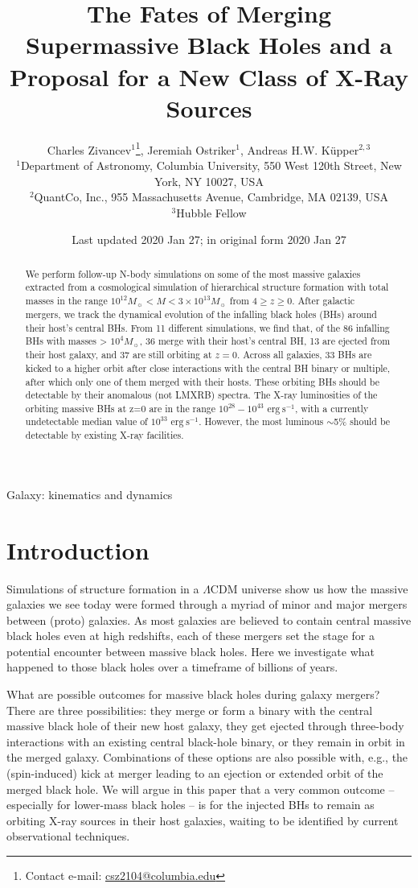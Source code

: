 \documentclass[fleqn,usenatbib,useAMS]{mnras}
\title[MNRAS]{The Fates of Merging Supermassive Black Holes and a Proposal for a New Class of X-Ray Sources}
\author[]{
Charles Zivancev$^{1}$\thanks{Contact e-mail: \href{mailto:csz2104@columbia.edu}{csz2104@columbia.edu}},
Jeremiah Ostriker$^{1}$,
Andreas H.W. K\"upper$^{2,3}$
\\
$^{1}$Department of Astronomy, Columbia University, 550 West 120th Street, New York, NY 10027, USA\\
$^{2}$QuantCo, Inc., 955 Massachusetts Avenue, Cambridge, MA 02139, USA\\
$^{3}$Hubble Fellow\\
}
\date{Last updated 2020 Jan 27; in original form 2020 Jan 27}
\begin{document}
\label{firstpage}
\pagerange{\pageref{firstpage}--\pageref{lastpage}}
\maketitle



\begin{abstract}
We perform follow-up N-body simulations on some of the most massive galaxies extracted from a cosmological simulation of hierarchical structure formation with total masses in the range $10^{12} M_{\sun} < M < 3\times 10^{13} M_{\sun}$ from $4\geq z \geq 0$.  After galactic mergers, we track the dynamical evolution of the infalling black holes (BHs) around their host's central BHs.  From 11 different simulations, we find that, of the 86 infalling BHs with masses > $10^4 M_{\sun}$, 36 merge with their host's central BH, 13 are ejected from their host galaxy, and 37 are still orbiting at $z=0$.  Across all galaxies, 33 BHs are kicked to a higher orbit after close interactions with the central BH binary or multiple, after which only one of them merged with their hosts.  These orbiting BHs should be detectable by their anomalous (not LMXRB) spectra.  The X-ray luminosities of the orbiting massive BHs at z=0 are in the range $10^{28}-10^{43}$ $\mathrm{erg}~\mathrm{s}^{-1}$, with a currently undetectable median value of $10^{33}$ $\mathrm{erg}~\mathrm{s}^{-1}$.  However, the most luminous $\sim$5\% should be detectable by existing X-ray facilities.
\end{abstract}


\begin{keywords}
Galaxy: kinematics and dynamics
\end{keywords}




\section{Introduction}\label{sec:introduction}
Simulations of structure formation in a $\Lambda$CDM universe show us how the massive galaxies we see today were formed through a myriad of minor and major mergers between (proto) galaxies. As most galaxies are believed to contain central massive black holes even at high redshifts, each of these mergers set the stage for a potential encounter between massive black holes. Here we investigate what happened to those black holes over a timeframe of billions of years.

What are possible outcomes for massive black holes during galaxy mergers?  There are three possibilities: they merge or form a binary with the central massive black hole of their new host galaxy, they get ejected through three-body interactions with an existing central black-hole binary, or they remain in orbit in the merged galaxy.  Combinations of these options are also possible with, e.g., the (spin-induced) kick at merger leading to an ejection or extended orbit of the merged black hole. We will argue in this paper that a very common outcome -- especially for lower-mass black holes -- is for the injected BHs to remain as orbiting X-ray sources in their host galaxies, waiting to be identified by current observational techniques.
\end{document}
